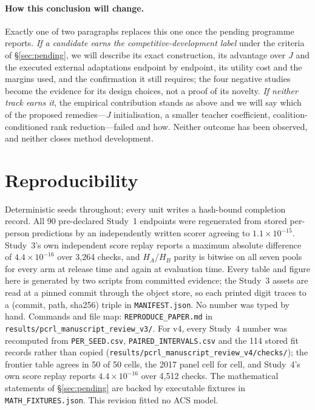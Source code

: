 \documentclass[10pt]{article}
\begin{document}
\paragraph{How this conclusion will change.} Exactly one of two paragraphs replaces this one once the
pending programme reports. \emph{If a candidate earns the competitive-development label} under the
criteria of \S\ref{sec:pending}, we will describe its exact construction, its advantage over $J$ and the
executed external adaptations endpoint by endpoint, its utility cost and the margins used, and the
confirmation it still requires; the four negative studies become the evidence for its design choices,
not a proof of its novelty. \emph{If neither track earns it}, the empirical contribution stands as above
and we will say which of the proposed remedies---$J$ initialisation, a smaller teacher coefficient,
coalition-conditioned rank reduction---failed and how. Neither outcome has been observed, and neither
closes method development.

\section{Reproducibility}

Deterministic seeds throughout; every unit writes a hash-bound completion record. All 90 pre-declared
Study~1 endpoints were regenerated from stored per-person predictions by an independently written
scorer agreeing to $1.1\times10^{-15}$. Study~3's own independent score replay reports a maximum
absolute difference of $4.4\times10^{-16}$ over 3{,}264 checks, and $H_A$/$H_B$ parity is bitwise on
all seven pools for every arm at release time and again at evaluation time. Every table and figure
here is generated by two scripts from committed evidence; the Study~3 assets are read at a pinned
commit through the object store, so each printed digit traces to a (commit, path, sha256) triple in
\texttt{MANIFEST.json}. No number was typed by hand. Commands and file map:
\texttt{REPRODUCE\_PAPER.md} in \texttt{results/pcrl\_manuscript\_review\_v3/}. For v4, every Study~4
number was recomputed from \texttt{PER\_SEED.csv}, \texttt{PAIRED\_INTERVALS.csv} and the 114 stored fit
records rather than copied (\texttt{results/pcrl\_manuscript\_review\_v4/checks/}); the frontier table
agrees in 50 of 50 cells, the 2017 panel cell for cell, and Study~4's own score replay reports
$4.4\times10^{-16}$ over 4{,}512 checks. The mathematical statements of \S\ref{sec:pending} are backed by
executable fixtures in \texttt{MATH\_FIXTURES.json}. This revision fitted no ACS model.
\end{document}
